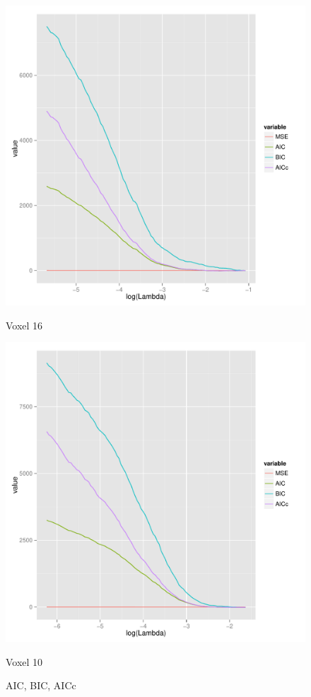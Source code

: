 \documentclass[english]{amsart}
\begin{document}
\begin{figure}[H]
  \includegraphics[width=\linewidth]{Voxel_2_AIC.pdf}
  \caption{Voxel 16}
\endminipage\hfill
\vspace{-5mm}
  \includegraphics[width=\linewidth]{Voxel_10_AIC.pdf}
  \caption{Voxel 10}
\endminipage
\caption{AIC, BIC, AICc}
\end{figure}
\vspace{-20mm}
\end{document}
